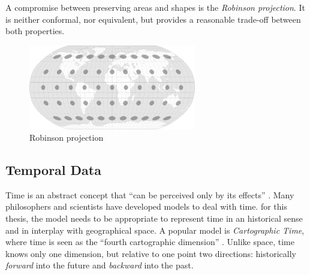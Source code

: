 \addtocounter{footnote}{1} %

A compromise between preserving areas and shapes is the \emph{Robinson projection}. It is neither conformal, nor equivalent, but provides a reasonable trade-off between both properties.

\begin{figure}[ht]
  \centering
  \includegraphics[width=0.65\textwidth]{graphics/basics/hgis/projection_distortion_robinson.png}
  \caption{Robinson projection \protect\footnotemark}
  \label{fig:robinson_projection}
\end{figure}




\subsection{Temporal Data} %
\label{sub:temporal_data}

Time is an abstract concept that ``can be perceived only by its effects''
\cite[p. 27]{Langran1989timeingis}.
Many philosophers and scientists have developed models to deal with time. for this thesis, the model needs to be appropriate to represent time in an historical sense and in interplay with geographical space. A popular model is \emph{Cartographic Time}, where time is seen as the ``fourth cartographic dimension''
\cite[p. 28]{Langran1989timeingis}.
Unlike space, time knows only one dimension, but relative to one point two directions: historically \emph{forward} into the future and \emph{backward} into the past.

